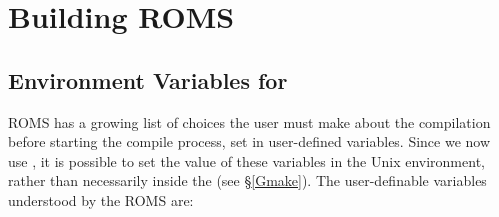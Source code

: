 \section{Building ROMS}
\label{Build}

\subsection{Environment Variables for }
\label{make_var}

ROMS has a growing list of choices the user must make about the
compilation before starting the compile process,
set in user-defined variables. Since we now use , it is
possible to set the value of these variables in the Unix environment,
rather than necessarily inside the  (see \S\ref{Gmake}).
The user-definable variables understood by the ROMS  are:
